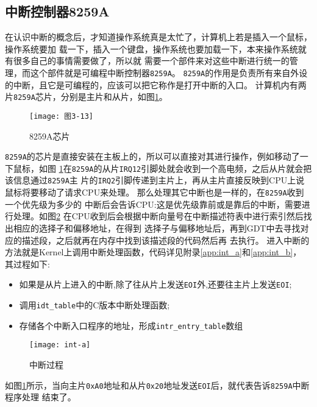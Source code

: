 \subsection{中断控制器8259A}

在认识中断的概念后，才知道操作系统真是太忙了，计算机上若是插入一个鼠标，操作系统要加
载一下，插入一个键盘，操作系统也要加载一下，本来操作系统就有很多自己的事情需要做了，所以就
需要一个部件来对这些中断进行统一的管理，而这个部件就是可编程中断控制器\texttt{8259A}。
\texttt{8259A}的作用是负责所有来自外设的中断，且它是可编程的，应该可以把它称作是打开中断的入口。
计算机内有两片\texttt{8259A}芯片，分别是主片和从片，如图\ref{fig:8259A}。

\begin{figure}[H]
  \centering
  \texttt{[image: 图3-13]}
  \caption{8259A芯片}
  \label{fig:8259A}
\end{figure}

\texttt{8259A}的芯片是直接安装在主板上的，所以可以直接对其进行操作，例如移动了一下鼠标，如图
\ref{fig:8259A}在\texttt{8259A}的从片\texttt{IRQ12}引脚处就会收到一个高电频，之后从片就会把该信息通过\texttt{8259A}主
片的\texttt{IRQ2}引脚传递到主片上，再从主片直接反映到CPU上说鼠标将要移动了请求CPU来处理。
那么处理其它中断也是一样的，在\texttt{8259A}收到一个优先级为多少的
中断后会告诉CPU:这是优先级靠前或是靠后的中断，需要进行处理。如图\ref{fig:interrupt_a}
在CPU收到后会根据中断向量号在中断描述符表中进行索引然后找出相应的选择子和偏移地址，在得到
选择子与偏移地址后，再到GDT中去寻找对应的描述段，之后就再在内存中找到该描述段的代码然后再
去执行。
进入中断的方法就是Kernel上调用中断处理函数，代码详见附录\ref{app:int_a}和\ref{app:int_b}，
其过程如下:

\begin{itemize}
\item 如果是从片上进入的中断,除了往从片上发送\texttt{EOI}外,还要往主片上发送\texttt{EOI};
\item 调用\texttt{idt\_table}中的C版本中断处理函数;
\item 存储各个中断入口程序的地址，形成\texttt{intr\_entry\_table}数组
\end{itemize}

\begin{figure}[H]
  \centering
  \texttt{[image: int-a]}
  \caption{中断过程}
  \label{fig:interrupt_a}
\end{figure}

如图\ref{fig:8259A}所示，当向主片\texttt{0xA0}地址和从片\texttt{0x20}地址发送\texttt{EOI}后，就代表告诉\texttt{8259A}中断程序处理
结束了。

